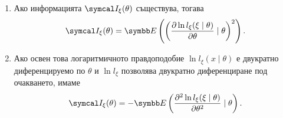 \documentclass[
  numbers=endperiod,
  headings=standardclasses,
  bibliography=totocnumbered,
]{scrartcl}
\begin{document}
\begin{theorem}
  \mbox{}
  \begin{enumerate}
    \item Ако информацията \( \FisherInfo_\xi(\theta) \) съществува, тогава
    \begin{equation*}
      \FisherInfo_\xi(\theta) = \Expect\left( {\left( \frac {\partial \ln l_\xi(\xi \mid \theta)} {\partial \theta} \mid \theta \right)}^2 \right).
    \end{equation*}

    \item Ако освен това логаритмичното правдоподобие \( \ln l_\xi (x \mid \theta) \) е двукратно диференцируемо по \( \theta \) и \( \ln l_\xi \) позволява двукратно диференциране под очакването, имаме
    \begin{equation*}
      \FisherInfo_\xi(\theta) = -\Expect\left( \frac {\partial^2 \ln l_\xi(\xi \mid \theta)} {\partial \theta^2} \mid \theta \right).
    \end{equation*}
  \end{enumerate}
\end{theorem}
\end{document}
